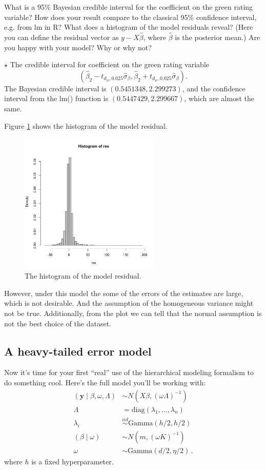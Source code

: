 \documentclass[11pt]{article}
\newcommand{\by}{\textbf{y}}
\newcommand{\jie}{$\star$ }
\begin{document}
What is a 95\% Bayesian credible interval for the coefficient on the green rating variable?  How does your result compare to the classical 95\% confidence interval, e.g. from lm in R?  What does a histogram of the model residuals reveal?  (Here you can define the residual vector as $y - X \hat{\beta}$, where $\hat{\beta}$ is the posterior mean.)  Are you happy with your model?  Why or why not?  

\bigskip
\jie
The credible interval for coefficient on the green rating variable
$$(\hat{\beta}_2 - t_{d_w,0.025}\hat{\sigma}_\beta,\hat{\beta}_2 + t_{d_w,0.025}\hat{\sigma}_\beta).$$
The Bayesian credible interval is $( 0.5451348 , 2.299273 )$, and the confidence interval from the lm() function is $(0.5447429, 2.299667)$, which are almost the same.

Figure \ref{fig:hist_res} shows the histogram of the model residual.
\begin{figure}[h]
    \centering
    \includegraphics[width=0.6\textwidth]{Ex3/figures/res.jpeg}
    \caption{The histogram of the model residual.}
    \label{fig:hist_res}
\end{figure}

However, under this model the some of the errors of the estimates are large, which is not desirable. And the assumption of the homogeneous variance might not be true. Additionally, from the plot we can tell that the normal assumption is not the best choice of the dataset.  

\subsection{A heavy-tailed error model}


Now it's time for your first ``real'' use of the hierarchical modeling formalism to do something cool.  Here's the full model you'll be working with:
\begin{align}
(\by \mid \beta, \omega, \Lambda) &\sim N(X \beta, (\omega \Lambda)^{-1}) \\
\Lambda &= \mbox{diag}(\lambda_1, \ldots, \lambda_n) \\
\lambda_i &\stackrel{iid}{\sim} \mbox{Gamma}(h/2, h/2) \\
(\beta \mid \omega) &\sim N(m, (\omega K)^{-1}) \\
\omega &\sim \mbox{Gamma}(d/2, \eta/2) \, .
\end{align}
where $h$ is a fixed hyperparameter.
\end{document}
